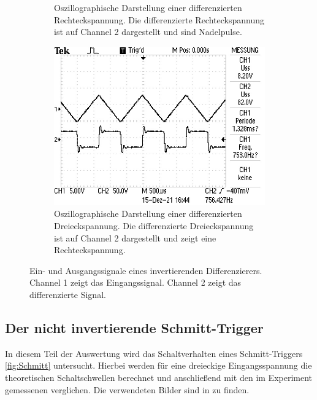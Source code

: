 \begin{figure}
\begin{subfigure}[b]{0.45\textwidth}
        \caption{Oszillographische Darstellung einer differenzierten Rechteckspannung.
        Die differenzierte Rechteckspannung ist auf Channel 2 dargestellt und sind Nadelpulse.\cite{int_picture}}
        \label{fig:diff_recht}
    \end{subfigure}
    \newline
    \newline  
    \newline
    \newline  
    \newline  
    \begin{subfigure}{0.45\textwidth}
        \centering
        \includegraphics[width=\textwidth]{data_of_others_cuz_ours_suck/diff/diff dreieck.JPG}
        \caption{Oszillographische Darstellung einer differenzierten Dreieckspannung.
        Die differenzierte Dreieckspannung ist auf Channel 2 dargestellt und zeigt eine Rechteckspannung.\cite{int_picture}}
        \label{fig:diff_drei}
    \end{subfigure}
       \caption{Ein- und Ausgangssignale eines invertierenden Differenzierers. Channel 1 zeigt
       das Eingangssignal. Channel 2 zeigt das differenzierte Signal.}
       \label{fig:diff}
\end{figure}
\FloatBarrier

\subsection{Der nicht invertierende Schmitt-Trigger \cite{schmitt}}
In diesem Teil der Auswertung wird das Schaltverhalten eines Schmitt-Triggers \autoref{fig:Schmitt}
untersucht.
Hierbei werden für eine dreieckige Eingangsspannung die theoretischen Schaltschwellen berechnet und 
anschließend mit den im Experiment gemessenen verglichen.
Die verwendeten Bilder sind in \cite{schmitt} zu finden.

